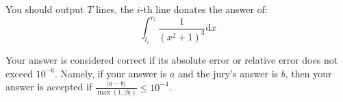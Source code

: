 You should output $T$ lines, the $i$-th line donates the answer of:
$$
\int_{l_i}^{r_i}\frac{1}{(x^2+1)^3}\mathrm{d}x
$$

Your answer is considered correct if its absolute error or relative error does not exceed $10^{-6}$. Namely, if your answer is $a$ and the jury's answer is $b$, then your answer is accepted if $\frac{|a-b|}{\max(1, |b|)}\le 10^{-4}$.